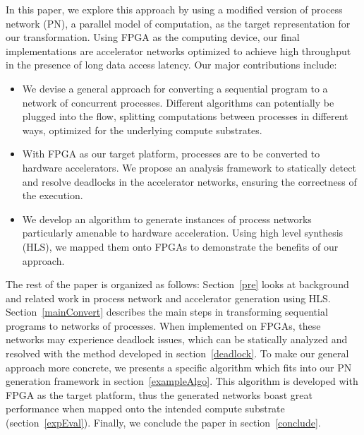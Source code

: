 \documentclass{sig-alternate}
\begin{document}
In this paper, we explore this approach by using a modified version of process network (PN), a parallel model of computation, as the target representation for our transformation.
Using FPGA as the computing device, our final implementations are accelerator networks optimized to achieve high throughput in the presence of long data access latency.
Our major contributions include:
\begin{itemize}
    \item We devise a general approach for converting a sequential program to a network
of concurrent processes. Different algorithms can potentially be plugged into the flow, splitting computations between processes in different ways, optimized for the underlying compute substrates.
    \item With FPGA as our target platform, processes are to be converted to hardware accelerators. We
    propose an analysis framework to statically detect and resolve deadlocks in the accelerator networks, ensuring the correctness of the execution. 
    \item We develop an algorithm to generate instances of process networks
particularly amenable to hardware acceleration. Using high level synthesis (HLS), we mapped them onto FPGAs
to demonstrate the benefits of our approach. 
\end{itemize}

The rest of the paper is organized as follows:
Section~\ref{pre} looks at background and related work in process network
and accelerator generation using HLS. Section~\ref{mainConvert} describes the main steps in transforming sequential programs
to networks of processes. When implemented on FPGAs, these networks may experience deadlock issues, which can be statically analyzed and resolved with the method developed in section~\ref{deadlock}. To make our general approach more concrete, we presents a specific algorithm which fits into our PN generation framework in section~\ref{exampleAlgo}.
This algorithm is developed with FPGA as the target platform, thus the generated networks boast great performance when mapped onto the intended 
compute substrate (section~\ref{expEval}). Finally, we conclude the paper in section~\ref{conclude}.
\end{document}
